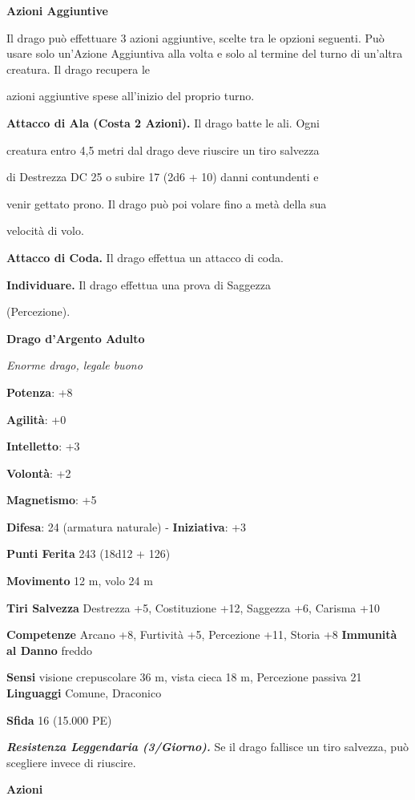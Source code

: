 \begin{multicols}{2}
\textbf{Azioni Aggiuntive}

Il drago può effettuare 3 azioni aggiuntive, scelte tra le opzioni  seguenti. Può usare solo un'Azione Aggiuntiva alla volta e solo  al termine del turno di un'altra creatura. Il drago recupera le

azioni aggiuntive spese all'inizio del proprio turno.

\textbf{Attacco di Ala (Costa 2 Azioni).} Il drago batte le ali. Ogni

creatura entro 4,5 metri dal drago deve riuscire un tiro salvezza

di Destrezza DC 25 o subire 17 (2d6 + 10) danni contundenti e

venir gettato prono. Il drago può poi volare fino a metà della sua

velocità di volo.

\textbf{Attacco di Coda.} Il drago effettua un attacco di coda.

\textbf{Individuare.} Il drago effettua una prova di Saggezza

(Percezione).



\textbf{Drago d'Argento Adulto}

\emph{Enorme drago, legale buono}

\textbf{Potenza}: +8

\textbf{Agilità}: +0

\textbf{Intelletto}: +3

\textbf{Volontà}: +2

\textbf{Magnetismo}: +5

\textbf{Difesa}: 24 (armatura naturale) - \textbf{Iniziativa}: +3

\textbf{Punti Ferita} 243 (18d12 + 126)

\textbf{Movimento} 12 m, volo 24 m

\textbf{Tiri Salvezza} Destrezza +5, Costituzione +12, Saggezza +6,
Carisma +10

\textbf{Competenze} Arcano +8, Furtività +5, Percezione +11, Storia +8
\textbf{Immunità al Danno} freddo

\textbf{Sensi} visione crepuscolare 36 m, vista cieca 18 m, Percezione passiva
21 \textbf{Linguaggi} Comune, Draconico

\textbf{Sfida} 16 (15.000 PE)

\emph{\textbf{Resistenza Leggendaria (3/Giorno).}} Se il drago fallisce
un tiro salvezza, può scegliere invece di riuscire.

\textbf{Azioni}


\end{multicols}
